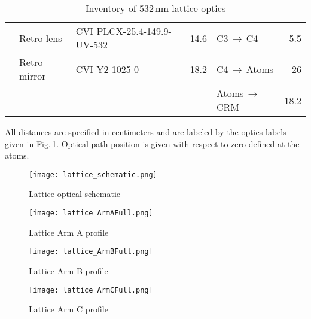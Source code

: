 \begin{table}[]
{{\begin{tabular}{@{}|c|llr|lr|@{}}
 & Retro lens & CVI PLCX-25.4-149.9-UV-532 & 14.6 & C3$\,\rightarrow\,$C4 & 5.5 \\
 & Retro mirror & CVI Y2-1025-0 & 18.2 & C4$\,\rightarrow\,$Atoms & 26 \\
 &  &  &  & Atoms$\,\rightarrow\,$CRM & 18.2 \\ \bottomrule
\end{tabular}%
}}
\caption{Inventory of $532\,\text{nm}$ lattice optics}{All distances are specified in centimeters and are labeled by the optics labels given in Fig.\,\ref{fig:532schematic}. Optical path position is given with respect to zero defined at the atoms.}
\label{tab:532sys}
\end{table}

	\begin{figure} 
		\centerline{
		\texttt{[image: lattice\_schematic.png]}}
		\caption{Lattice optical schematic}
		\label{fig:532schematic}
	\end{figure}
	
	\begin{figure} 
		\centerline{
		\texttt{[image: lattice\_ArmAFull.png]}}
		\caption{Lattice Arm A profile}
		\label{fig:532armAProfile}
	\end{figure}
	
	\begin{figure} 
		\centerline{
		\texttt{[image: lattice\_ArmBFull.png]}}
		\caption{Lattice Arm B profile}
		\label{fig:532armBProfile}
	\end{figure}
	
	\begin{figure} 
		\centerline{
		\texttt{[image: lattice\_ArmCFull.png]}}
		\caption{Lattice Arm C profile}
		\label{fig:532armCProfile}
	\end{figure}

